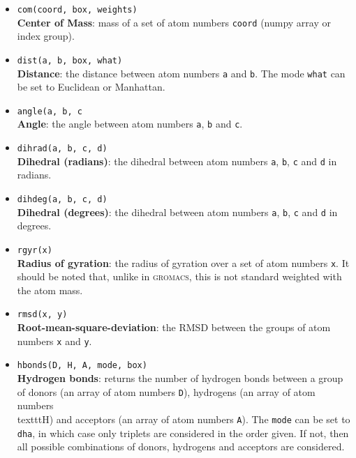 \documentclass[]{article}
\begin{document}
\begin{itemize}
\item 	\texttt{com(coord, box, weights)}\\
		\textbf{Center of Mass}: mass of a set of atom numbers \texttt{coord} (numpy array or index group).
\item 	\texttt{dist(a, b, box, what)}\\
		\textbf{Distance}: the distance between atom numbers \texttt{a} and \texttt{b}. The mode \texttt{what} can be set to Euclidean or Manhattan.
\item 	\texttt{angle(a, b, c}\\
		\textbf{Angle}: the angle between atom numbers \texttt{a}, \texttt{b} and \texttt{c}.
\item 	\texttt{dihrad(a, b, c, d)}\\
		\textbf{Dihedral (radians)}: the dihedral between atom numbers \texttt{a}, \texttt{b}, \texttt{c} and \texttt{d} in radians.
\item 	\texttt{dihdeg(a, b, c, d)}\\
		\textbf{Dihedral (degrees)}: the dihedral between atom numbers \texttt{a}, \texttt{b}, \texttt{c} and \texttt{d} in degrees.
\item 	\texttt{rgyr(x)}\\
		\textbf{Radius of gyration}: the radius of gyration over a set of atom numbers \texttt{x}.
		It should be noted that, unlike in \textsc{gromacs}, this is not standard weighted with the atom mass.
\item 	\texttt{rmsd(x, y)}\\
		\textbf{Root-mean-square-deviation}: the RMSD between the groups of atom numbers \texttt{x} and \texttt{y}.
\item 	\texttt{hbonds(D, H, A, mode, box)}\\
		\textbf{Hydrogen bonds}: returns the number of hydrogen bonds between a group of donors (an array of atom numbers \texttt{D}), hydrogens (an array of atom numbers \\texttt{H}) and acceptors (an array of atom numbers \texttt{A}). The \texttt{mode} can be set to \texttt{dha}, in which case only triplets are considered in the order given. If not, then all possible combinations of donors, hydrogens and acceptors are considered. 
\end{itemize}
\end{document}
